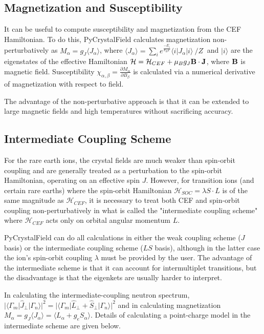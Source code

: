 \documentclass[twocolumn,english,prb]{revtex4-2}
\begin{document}
\subsection{Magnetization and Susceptibility}

\sloppy It can be useful to compute susceptibility and magnetization from the CEF Hamiltonian. To do this, PyCrystalField calculates magnetization non-perturbatively as $M_{\alpha} = g_J \langle J_{\alpha} \rangle$, where $\langle J_{\alpha} \rangle = \sum_i e^{\frac{-E_i}{k_B T}}\langle i \rvert J_{\alpha} \lvert i \rangle ~/ Z~$ and $|i\rangle$ are the eigenstates of the effective Hamiltonian ${\cal H} = {\cal H}_{CEF} + \mu_B g_J {\bf B}\cdot {\bf J} $, where ${\bf B}$ is magnetic field. Susceptibility $\chi_{\alpha, \beta} = \frac{\partial M_{\alpha}}{\partial B_{\beta}}$ is calculated via a numerical derivative of magnetization with respect to field.

The advantage of the non-perturbative approach is that it can be extended to large magnetic fields and high temperatures without sacrificing accuracy.


\subsection{Intermediate Coupling Scheme}

For the rare earth ions, the crystal fields are much weaker than spin-orbit coupling and are generally treated as a perturbation to the spin-orbit Hamiltonian, operating on an effective spin $J$. However, for transition ions (and certain rare earths) where the spin-orbit Hamiltonian $\mathcal{H}_{SOC}=\lambda S \cdot L$ is of the same magnitude as $\mathcal{H}_{CEF}$, it is necessary to treat both CEF and spin-orbit coupling non-perturbatively in what is called the "intermediate coupling scheme" where $\mathcal{H}_{CEF}$ acts only on orbital angular momentum $L$. \cite{AbragamBleaney}

PyCrystalField can do all calculations in either the weak coupling scheme ($J$ basis) or the intermediate coupling scheme ($LS$ basis), although in the latter case the ion's spin-orbit coupling $\lambda$ must be provided by the user. The advantage of the intermediate scheme is that it can account for intermultiplet transitions, but the disadvantage is that the eigenkets are usually harder to interpret. 

In calculating the intermediate-coupling neutron spectrum, $|\langle \Gamma_m|\hat J_{\perp}|\Gamma_n \rangle|^2  = |\langle \Gamma_m|\hat L_{\perp} + \hat S_{\perp}|\Gamma_n \rangle|^2 $ and in calculating magnetization $M_{\alpha} = g_J \langle J_{\alpha} \rangle = \langle L_{\alpha} + g_e S_{\alpha} \rangle$. Details of calculating a point-charge model in the intermediate scheme are given below.
\end{document}
